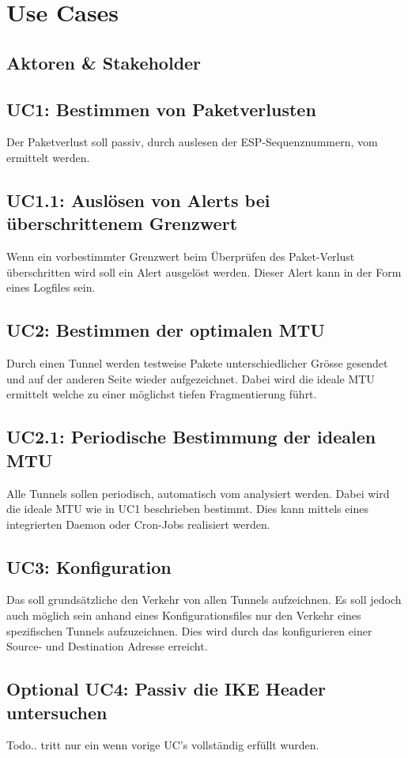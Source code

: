 \section{Use Cases}
\label{sec:Use Cases}


\subsection{Aktoren \& Stakeholder}


\subsection{UC1: Bestimmen von Paketverlusten}
Der Paketverlust soll passiv, durch auslesen der ESP-Sequenznummern, vom \tool ermittelt werden.

\subsection{UC1.1: Auslösen von Alerts bei überschrittenem Grenzwert}
Wenn ein vorbestimmter Grenzwert beim Überprüfen des Paket-Verlust  überschritten wird soll ein Alert ausgelöst werden. Dieser Alert kann in der Form eines Logfiles sein.

\subsection{UC2: Bestimmen der optimalen MTU}
Durch einen Tunnel werden testweise Pakete unterschiedlicher Grösse gesendet und auf der anderen Seite wieder aufgezeichnet. Dabei wird die ideale MTU ermittelt welche zu einer möglichst tiefen Fragmentierung führt.

\subsection{UC2.1: Periodische Bestimmung der idealen MTU}
Alle Tunnels sollen periodisch, automatisch vom \tool analysiert werden. Dabei wird die ideale MTU wie in UC1 beschrieben bestimmt. Dies kann mittels eines integrierten Daemon oder Cron-Jobs realisiert werden.

\subsection{UC3: Konfiguration}
Das \tool soll grundsätzliche den Verkehr von allen Tunnels aufzeichnen. Es soll jedoch auch möglich sein anhand eines Konfigurationsfiles nur den Verkehr eines spezifischen Tunnels aufzuzeichnen. Dies wird durch das konfigurieren einer Source- und Destination Adresse erreicht.

\subsection{Optional UC4: Passiv die IKE Header untersuchen}
Todo.. tritt nur ein wenn vorige UC's vollständig erfüllt wurden.